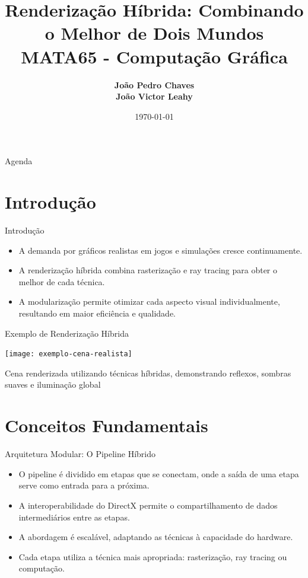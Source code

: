 \documentclass[aspectratio=169,xcolor=table]{beamer}
\author[Chaves, Leahy]{%
  \textbf{João Pedro Chaves} \\
  \textbf{João Victor Leahy}
}
\title{Renderização Híbrida: Combinando o Melhor de Dois Mundos \\ \large{MATA65 - Computação Gráfica}}
\institute{Universidade Federal da Bahia \\ Instituto de Computação}
\date{\today}
\begin{document}
\begin{frame}
    \titlepage
\end{frame}

\begin{frame}{Agenda}
    \tableofcontents[hideallsubsections]
\end{frame}

\section{Introdução}
\begin{frame}{Introdução}
    \begin{itemize}
        \item A demanda por gráficos realistas em jogos e simulações cresce continuamente.
        \item A renderização híbrida combina rasterização e ray tracing para obter o melhor de cada técnica.
        \item A modularização permite otimizar cada aspecto visual individualmente, resultando em maior eficiência e qualidade.
    \end{itemize}
\end{frame}

\begin{frame}{Exemplo de Renderização Híbrida}
    \begin{center}
        \texttt{[image: exemplo-cena-realista]}
    \end{center}
    \begin{center}
        \small{Cena renderizada utilizando técnicas híbridas, demonstrando reflexos, sombras suaves e iluminação global}
    \end{center}
\end{frame}

\section{Conceitos Fundamentais}
\begin{frame}{Arquitetura Modular: O Pipeline Híbrido}
    \begin{itemize}
        \item O pipeline é dividido em etapas que se conectam, onde a saída de uma etapa serve como entrada para a próxima.
        \item A interoperabilidade do DirectX permite o compartilhamento de dados intermediários entre as etapas.
        \item A abordagem é escalável, adaptando as técnicas à capacidade do hardware.
        \item Cada etapa utiliza a técnica mais apropriada: rasterização, ray tracing ou computação.
    \end{itemize}
\end{frame}
\end{document}

